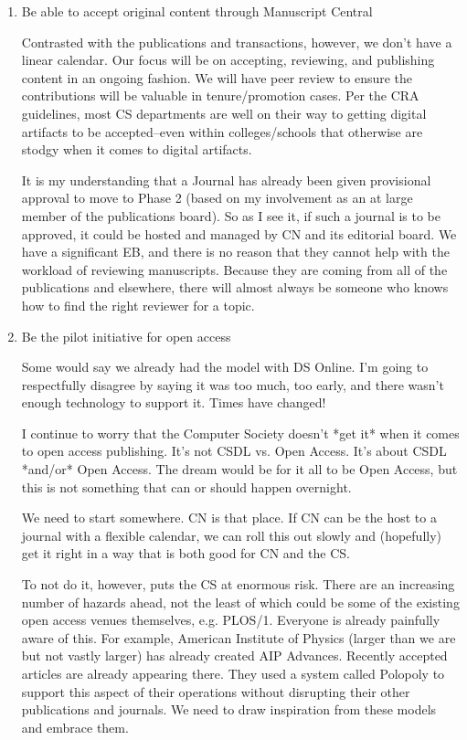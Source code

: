 \documentclass[11pt,english]{luclet}
\begin{document}
\begin{enumerate}
  
\item Be able to accept original content through Manuscript Central

  Contrasted with the publications and transactions, however, we don't
  have a linear calendar. Our focus will be on accepting, reviewing, and
  publishing content in an ongoing fashion. We will have peer review to
  ensure the contributions will be valuable in tenure/promotion
  cases. Per the CRA guidelines, most CS departments are well on their
  way to getting digital artifacts to be accepted--even within
  colleges/schools that otherwise are stodgy when it comes to digital
  artifacts.

  It is my understanding that a Journal has already been given
  provisional approval to move to Phase 2 (based on my involvement as an
  at large member of the publications board). So as I see it, if such a
  journal is to be approved, it could be hosted and managed by CN and
  its editorial board.  We have a significant EB, and there is no reason
  that they cannot help with the workload of reviewing
  manuscripts. Because they are coming from all of the publications and
  elsewhere, there will almost always be someone who knows how to find
  the right reviewer for a topic.

\item Be the pilot initiative for open access

  Some would say we already had the model with DS Online. I'm going to
  respectfully disagree by saying it was too much, too early, and there
  wasn't enough technology to support it. Times have changed!

  I continue to worry that the Computer Society doesn't *get it* when it
  comes to open access publishing. It's not CSDL vs. Open Access. It's
  about CSDL *and/or* Open Access. The dream would be for it all to be
  Open Access, but this is not something that can or should happen
  overnight.

  We need to start somewhere. CN is that place. If CN can be the host to
  a journal with a flexible calendar, we can roll this out slowly and
  (hopefully) get it right in a way that is both good for CN and the CS.

  To not do it, however, puts the CS at enormous risk. There are an
  increasing number of hazards ahead, not the least of which could be
  some of the existing open access venues themselves,
  e.g. PLOS/1. Everyone is already painfully aware of this. For example,
  American Institute of Physics (larger than we are but not vastly
  larger) has already created AIP Advances. Recently accepted articles
  are already appearing there. They used a system called Polopoly to
  support this aspect of their operations without disrupting their other
  publications and journals. We need to draw inspiration from these
  models and embrace them.


\end{enumerate}
\end{document}
